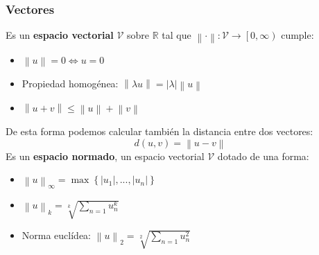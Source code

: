 \subsubsection{Vectores}
Es un \textbf{espacio vectorial} \(\mathcal{V}\) sobre \(\mathbb{R}\) tal que \(\left \| \cdot  \right \|: \mathcal{V} \rightarrow\left [ 0, \infty \right )\) cumple:
\begin{itemize}
        \item \(\left \| u \right \| = 0 \Leftrightarrow  u = 0\)
        \item Propiedad homogénea: \(\left \| \lambda u \right \| = \left | \lambda \right |\left \| u \right \|\)
        \item \(\left \| u + v \right \| \leq  \left \| u \right \| + \left \| v \right \|\)
\end{itemize}
De esta forma podemos calcular también la distancia entre dos vectores:
\[
        d(u,v) = \left \| u - v \right \|
\]
Es un \textbf{espacio normado}, un espacio vectorial \(\mathcal{V}\) dotado de una forma:
\begin{itemize}
        \item \(\left \| u \right \|_{\infty} = \max \left \{ \left | u_1 \right |, ..., \left | u_n \right | \right \} \)
        \item \(\left \| u \right \|_k=\sqrt[k]{\sum_{n=1} u_n^k}\)
        \item Norma euclídea: \(\left \| u \right \|_2=\sqrt[2]{\sum_{n=1} u_n^2}\)
\end{itemize}
